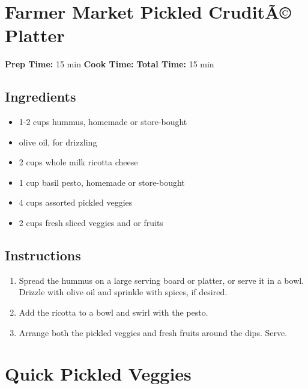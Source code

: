 \documentclass[
  letterpaper,
  DIV=11,
  numbers=noendperiod,
  titlepage=false]{scrreprt}
\providecommand{\tightlist}{%
  \setlength{\itemsep}{0pt}\setlength{\parskip}{0pt}}\usepackage{longtable,booktabs,array}
\begin{document}

\chapter{Farmer Market Pickled CruditÃ©
Platter}\label{farmer-market-pickled-crudituxe3-platter}

\textbf{Prep Time:} 15 min \textbar{} \textbf{Cook Time:} \textbar{}
\textbf{Total Time:} 15 min

\section{Ingredients}\label{ingredients-85}

\begin{itemize}
\tightlist
\item
  1-2 cups hummus, homemade or store-bought
\item
  olive oil, for drizzling
\item
  2 cups whole milk ricotta cheese
\item
  1 cup basil pesto, homemade or store-bought
\item
  4 cups assorted pickled veggies
\item
  2 cups fresh sliced veggies and or fruits
\end{itemize}

\section{Instructions}\label{instructions-85}

\begin{enumerate}
\def\labelenumi{\arabic{enumi}.}
\tightlist
\item
  Spread the hummus on a large serving board or platter, or serve it in
  a bowl. Drizzle with olive oil and sprinkle with spices, if desired.
\item
  Add the ricotta to a bowl and swirl with the pesto.
\item
  Arrange both the pickled veggies and fresh fruits around the dips.
  Serve.
\end{enumerate}


\chapter{Quick Pickled Veggies}\label{quick-pickled-veggies}
\end{document}

